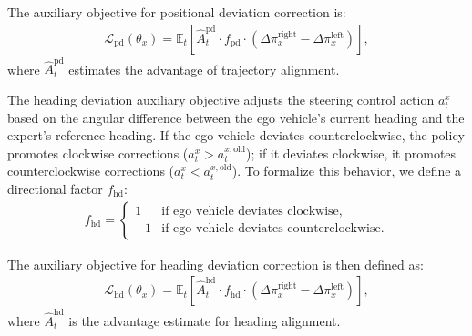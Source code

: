 The auxiliary objective for positional deviation correction is:
\begin{equation}
\begin{aligned}
\mathcal{L}_\text{pd}(\theta_x) = \mathbb{E}_t \left[ 
    \hat{A}_t^\text{pd} \cdot f_\text{pd} \cdot (\Delta \pi_x^{\text{right}} - \Delta \pi_x^{\text{left}})
\right],
\end{aligned}
\end{equation}  
where $\hat{A}_t^\text{pd}$ estimates the advantage of trajectory alignment.

The heading deviation auxiliary objective adjusts the steering control action $a_t^x$ based on the angular difference between the ego vehicle’s current heading and the expert’s reference heading. If the ego vehicle deviates counterclockwise, the policy promotes clockwise corrections ($a_t^x > a_t^{x,\text{old}}$); if it deviates clockwise, it promotes counterclockwise corrections ($a_t^x < a_t^{x,\text{old}}$). To formalize this behavior, we define a directional factor $f_\text{hd}$:  
\begin{equation}
\begin{aligned}
f_\text{hd} = \begin{cases} 
1 & \text{if ego vehicle deviates clockwise}, \\
-1 & \text{if ego vehicle deviates counterclockwise}.
\end{cases} 
\end{aligned}
\end{equation}

The auxiliary objective for heading deviation correction is then defined as:  
\begin{equation}
\begin{aligned}
\mathcal{L}_\text{hd}(\theta_x) = \mathbb{E}_t \left[ 
    \hat{A}_t^\text{hd} \cdot f_\text{hd} \cdot (\Delta \pi_x^{\text{right}} - \Delta \pi_x^{\text{left}})
\right],
\end{aligned}
\end{equation}  
where $\hat{A}_t^\text{hd}$ is the advantage estimate for heading alignment.  

